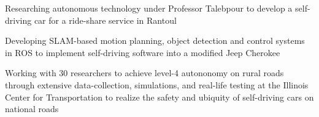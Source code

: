 \begin{cvitemize}
\item Researching autonomous technology under Professor Talebpour to develop a self-driving car for a ride-share service in Rantoul
\item Developing SLAM-based motion planning, object detection and control systems in ROS to implement self-driving software into a modified Jeep Cherokee
\item Working with 30 researchers to achieve level-4 autononomy on rural roads through extensive data-collection, simulations, and real-life testing at the Illinois Center for Transportation to realize the safety and ubiquity of self-driving cars on national roads
\end{cvitemize}